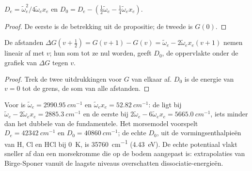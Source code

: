 \begin{corollary}\label{cor:b3:rovibrational-spectroscopy:de}
$D_e = \tilde\omega_e^2/4\tilde\omega_ex_e$ en $D_0 = D_e - (\frac12\tilde\omega_e -
\frac14\tilde\omega_ex_e)$.
\end{corollary}

\begin{proof}
De eerste is de betrekking uit de propositie; de tweede is $G(0)$.
\end{proof}

\begin{proposition}\label{prop:b3:rovibrational-spectroscopy:birge-sponer}
De afstanden $\Delta G(v + \frac12) = G(v+1) - G(v) = \tilde\omega_e - 2\tilde\omega_ex_e(v +
1)$ nemen lineair af met $v$; hun som tot ze nul worden, geeft $D_0$, de
oppervlakte onder de grafiek van $\Delta G$ tegen $v$.
\end{proposition}

\begin{proof}
Trek de twee uitdrukkingen voor $G$ van elkaar af. $D_0$ is de energie van
$v = 0$ tot de grens, de som van alle afstanden.
\end{proof}

\begin{example}[Waterstofchloride]\label{ex:b3:rovibrational-spectroscopy:hcl}
Voor  is $\tilde\omega_e = \qty{2990.95}{cm^{-1}}$ en $\tilde\omega_ex_e =
\qty{52.82}{cm^{-1}}$: de  ligt bij $\tilde\omega_e - 2\tilde\omega_ex_e =
\qty{2885.3}{cm^{-1}}$ en de eerste  bij $2\tilde\omega_e - 6\tilde\omega_ex_e =
\qty{5665.0}{cm^{-1}}$, iets minder dan het dubbele van de fundamentele.
Het morsemodel voorspelt $D_e = \qty{42342}{cm^{-1}}$ en $D_0 = \qty{40860}{cm^{-1}}$; de echte $D_0$,
uit de vormingsenthalpieën van H, Cl en HCl bij \qty{0}{K}, is
\qty{35760}{cm^{-1}} (\qty{4.43}{eV}). De echte potentiaal vlakt sneller af
dan een morsekromme die op de bodem aangepast is: extrapolaties van
Birge-Sponer vanuit de laagste niveaus overschatten
dissociatie-energieën.
\end{example}

